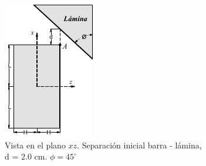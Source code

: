 \documentclass{exam}
\begin{document}
\begin{figure}[h]
\begin{subfigure}[r]{0.23\textwidth}
		\includegraphics[width=\textwidth]{images/barrapared.pdf} 
		\caption{Vista en el plano $xz$. Separación inicial barra - lámina, d = 2.0 cm. $\phi = 45^\circ$}
		\label{sfig:barra2D}
	\end{subfigure}
	\hspace*{20mm}
	\label{sfig:barra}
		\begin{subfigure}[r]{0.30\textwidth}

\end{subfigure}
\end{figure}
\end{document}
